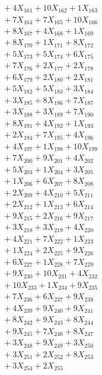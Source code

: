 \documentclass[a4paper,10pt]{article}
\begin{document}
{\begin{align}
&\;  + 4 X_{161} + 10 X_{162} + 1 X_{163} \\[0.5ex]\allowbreak
&\;  + 7 X_{164} + 7 X_{165} + 10 X_{166} \\[0.3ex]
&\;  + 8 X_{167} + 4 X_{168} + 1 X_{169} \\[0.3ex]
&\;  + 8 X_{170} + 1 X_{171} + 8 X_{172} \\[0.3ex]
&\;  + 5 X_{173} + 5 X_{174} + 6 X_{175} \\[0.3ex]
&\;  + 7 X_{176} + 2 X_{177} + 2 X_{178} \\[0.3ex]
&\;  + 6 X_{179} + 2 X_{180} + 2 X_{181} \\[0.3ex]
&\;  + 5 X_{182} + 5 X_{183} + 3 X_{184} \\[0.3ex]
&\;  + 3 X_{185} + 8 X_{186} + 7 X_{187} \\[0.3ex]
&\;  + 3 X_{188} + 3 X_{189} + 7 X_{190} \\[0.3ex]
&\;  + 8 X_{191} + 4 X_{192} + 1 X_{193} \\[0.5ex]\allowbreak
&\;  + 2 X_{194} + 7 X_{195} + 4 X_{196} \\[0.3ex]
&\;  + 4 X_{197} + 1 X_{198} + 10 X_{199} \\[0.3ex]
&\;  + 7 X_{200} + 9 X_{201} + 4 X_{202} \\[0.3ex]
&\;  + 5 X_{203} + 1 X_{204} + 3 X_{205} \\[0.3ex]
&\;  + 1 X_{206} + 6 X_{207} + 8 X_{208} \\[0.3ex]
&\;  + 2 X_{209} + 4 X_{210} + 5 X_{211} \\[0.3ex]
&\;  + 2 X_{212} + 1 X_{213} + 6 X_{214} \\[0.3ex]
&\;  + 9 X_{215} + 2 X_{216} + 9 X_{217} \\[0.3ex]
&\;  + 3 X_{218} + 3 X_{219} + 4 X_{220} \\[0.3ex]
&\;  + 4 X_{221} + 7 X_{222} + 1 X_{223} \\[0.5ex]\allowbreak
&\;  + 1 X_{224} + 2 X_{225} + 9 X_{226} \\[0.3ex]
&\;  + 6 X_{227} + 1 X_{228} + 7 X_{229} \\[0.3ex]
&\;  + 9 X_{230} + 10 X_{231} + 4 X_{232} \\[0.3ex]
&\;  + 10 X_{233} + 1 X_{234} + 9 X_{235} \\[0.3ex]
&\;  + 7 X_{236} + 6 X_{237} + 9 X_{238} \\[0.3ex]
&\;  + 4 X_{239} + 9 X_{240} + 9 X_{241} \\[0.3ex]
&\;  + 8 X_{242} + 9 X_{243} + 8 X_{244} \\[0.3ex]
&\;  + 9 X_{245} + 7 X_{246} + 8 X_{247} \\[0.3ex]
&\;  + 3 X_{248} + 9 X_{249} + 3 X_{250} \\[0.3ex]
&\;  + 3 X_{251} + 2 X_{252} + 8 X_{253} \\[0.5ex]\allowbreak
&\;  + 3 X_{254} + 2 X_{255}\nonumber
\end{align}
}
\end{document}
